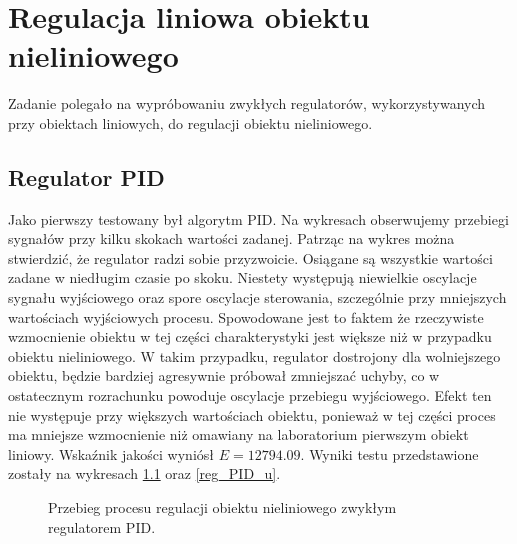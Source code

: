 \chapter{Regulacja liniowa obiektu nieliniowego}
\label{lab3}

Zadanie polegało na wypróbowaniu zwykłych regulatorów, wykorzystywanych przy obiektach liniowych, do regulacji obiektu nieliniowego.

\section{Regulator PID}
Jako pierwszy testowany był algorytm PID. 
Na wykresach obserwujemy przebiegi sygnałów przy kilku skokach wartości zadanej. 
Patrząc na wykres można stwierdzić, że regulator radzi sobie przyzwoicie. 
Osiągane są wszystkie wartości zadane w niedługim czasie po skoku. 
Niestety występują niewielkie oscylacje sygnału wyjściowego oraz spore oscylacje sterowania, szczególnie
przy mniejszych wartościach wyjściowych procesu. Spowodowane jest to faktem że rzeczywiste wzmocnienie
obiektu w tej części charakterystyki jest większe niż w przypadku obiektu nieliniowego. W takim przypadku,
regulator dostrojony dla wolniejszego obiektu, będzie bardziej agresywnie próbował zmniejszać uchyby, co 
w ostatecznym rozrachunku powoduje oscylacje przebiegu wyjściowego. Efekt ten nie występuje przy większych
wartościach obiektu, ponieważ w tej części proces ma mniejsze wzmocnienie niż omawiany na laboratorium pierwszym obiekt 
liniowy. 
Wskaźnik jakości wyniósł $E = \num{12794.09}$. 
Wyniki testu przedstawione zostały na wykresach \ref{reg_PID} oraz \ref{reg_PID_u}.

\begin{figure}[t]
    \centering
    \caption{Przebieg procesu regulacji obiektu nieliniowego zwykłym regulatorem PID.}
    \label{reg_PID}
\end{figure}

